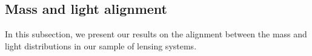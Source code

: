 \documentclass{aa}
\begin{document}
\subsection{Mass and light alignment} \label{sec:alignment_results}



In this subsection, we present our results on the alignment between the mass and light distributions in our sample of lensing systems.
\end{document}
